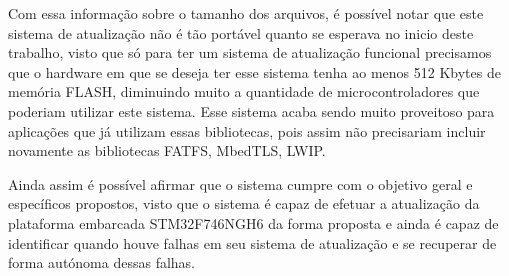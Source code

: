 Com essa informação sobre o tamanho dos arquivos, é possível notar que este sistema de atualização não é tão portável quanto se esperava no inicio deste trabalho, visto que só para ter um sistema de atualização funcional precisamos que o hardware em que se deseja ter esse sistema tenha ao menos 512 Kbytes de memória FLASH, diminuindo muito a quantidade de microcontroladores que poderiam utilizar este sistema. Esse sistema acaba sendo muito proveitoso para aplicações que já utilizam essas bibliotecas, pois assim não precisariam incluir novamente as bibliotecas FATFS, MbedTLS, LWIP.

Ainda assim é possível afirmar que o sistema cumpre com o objetivo geral e específicos propostos, visto que o sistema é capaz de efetuar a atualização da plataforma embarcada STM32F746NGH6 da forma proposta e ainda é capaz de identificar quando houve falhas em seu sistema de atualização e se recuperar de forma autónoma dessas falhas.
